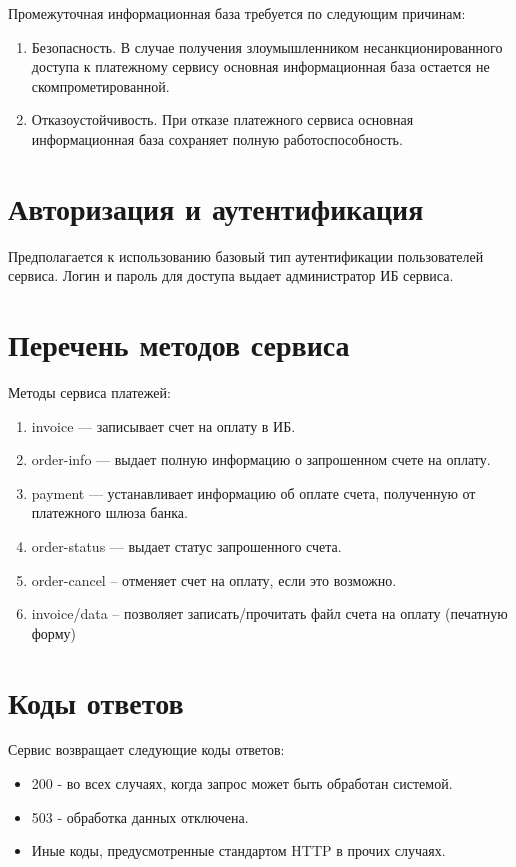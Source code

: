 \documentclass[11pt, a4paper]{article}
\begin{document}
Промежуточная информационная база требуется по следующим причинам:

\begin{enumerate}
	\item Безопасность. В случае получения злоумышленником несанкционированного доступа к платежному сервису основная информационная база остается не скомпрометированной.
	\item Отказоустойчивость. При отказе платежного сервиса основная информационная база сохраняет полную работоспособность.
\end{enumerate}

\section{Авторизация и аутентификация}

Предполагается к использованию базовый тип аутентификации пользователей сервиса. Логин и пароль для доступа выдает администратор ИБ сервиса.

\section{Перечень методов сервиса}

Методы сервиса платежей:

\begin{enumerate}
	\item invoice — записывает счет на оплату в ИБ.
	\item order-info — выдает полную информацию о запрошенном счете на оплату.
	\item payment — устанавливает информацию об оплате счета, полученную от платежного шлюза банка.
	\item order-status — выдает статус запрошенного счета.
	\item order-cancel – отменяет счет на оплату, если это возможно.
	\item invoice/data – позволяет записать/прочитать файл счета на оплату (печатную форму)
\end{enumerate}

\section{Коды ответов}

Сервис возвращает следующие коды ответов:

\begin{itemize}
	\item 200 - во всех случаях, когда запрос может быть обработан системой.
	\item 503 - обработка данных отключена.
	\item Иные коды, предусмотренные стандартом HTTP в прочих случаях.
\end{itemize}
\end{document}
